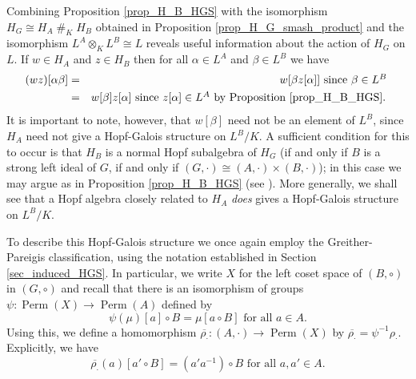 \documentclass[12pt,a4paper, reqno]{amsart}
\theoremstyle{definition}
\DeclareMathOperator{\Perm}{\mbox{Perm}}
\begin{document}
Combining Proposition \ref{prop_H_B_HGS} with the isomorphism $ H_{G} \cong H_{A} \; \#_{K} \; H_{B} $ obtained in Proposition \ref{prop_H_G_smash_product} and the isomorphism $ L^{A} \otimes_{K} L^{B} \cong L $ reveals useful information about the action of $ H_{G} $ on $ L $. If $ w \in H_{A} $ and $ z \in H_{B} $ then for all $ \alpha \in L^{A} $ and $ \beta \in L^{B} $ we have
\begin{eqnarray}
(wz)[\alpha\beta] & = & w[ \beta z[\alpha] ] \mbox{ since $ \beta \in L^{B} $ } \nonumber \\ 
& = & w[\beta] z[\alpha] \mbox{ since $ z[\alpha] \in L^{A} $ by Proposition \ref{prop_H_B_HGS}. } \label{eqn_H_G_action_on_product}
\end{eqnarray}
It is important to note, however, that $ w[\beta] $ need not be an element of $ L^{B} $, since $ H_{A} $ need not give a Hopf-Galois structure on $ L^{B}/K $. A sufficient condition for this to occur is that $ H_{B} $ is a normal Hopf subalgebra of $ H_{G} $ (if and only if $ B $ is a strong left ideal of $ G $, if and only if $ (G,\cdot) \cong (A,\cdot) \times (B,\cdot) $); in this case we may argue as in Proposition \ref{prop_H_B_HGS} (see \cite[Section 8.3]{HAGMT}). More generally, we shall see that a Hopf algebra closely related to $ H_{A} $ \textit{does} gives a Hopf-Galois structure on $ L^{B}/K $. 

To describe this Hopf-Galois structure we once again employ the Greither-Pareigis classification, using the notation established in Section \ref{sec_induced_HGS}. In particular, we write $ X $ for the left coset space of $ (B,\circ) $ in $ (G,\circ) $ and recall that there is an isomorphism of groups $ \psi : \Perm(X) \rightarrow \Perm(A) $ defined by 
\[ \psi(\mu)[a] \circ B = \mu[a \circ B] \mbox{ for all } a \in A. \] 
Using this, we define a homomorphism $ \overline{\rho_{\cdot}} : (A,\cdot) \rightarrow \Perm(X) $ by $ \overline{\rho_{\cdot}} = \psi^{-1} \rho_{\cdot} $. Explicitly, we have
\[ \overline{\rho_{\cdot}}(a)[a' \circ B] = (a' a^{-1}) \circ B \mbox{ for all } a,a' \in A. \]
\end{document}
